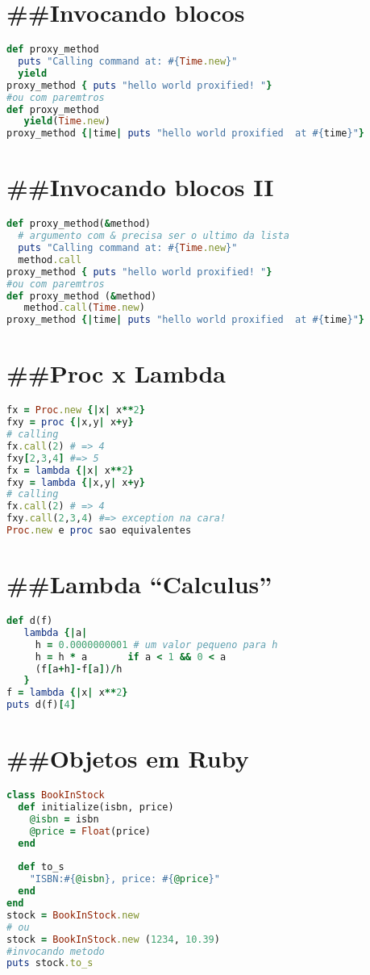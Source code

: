 \documentclass[serif,mathserif]{article}
\begin{document}
\section{\#\#Invocando blocos}
\begin{lstlisting}[language=ruby]
def proxy_method
  puts "Calling command at: #{Time.new}"
  yield
proxy_method { puts "hello world proxified! "}
#ou com paremtros
def proxy_method
   yield(Time.new)
proxy_method {|time| puts "hello world proxified  at #{time}"}
\end{lstlisting}


\section{\#\#Invocando blocos II}
\begin{lstlisting}[language=ruby]
def proxy_method(&method)
  # argumento com & precisa ser o ultimo da lista
  puts "Calling command at: #{Time.new}"
  method.call
proxy_method { puts "hello world proxified! "}
#ou com paremtros
def proxy_method (&method)
   method.call(Time.new)
proxy_method {|time| puts "hello world proxified  at #{time}"}
\end{lstlisting}

\section{\#\#Proc x Lambda}
\begin{lstlisting}[language=ruby]
fx = Proc.new {|x| x**2}
fxy = proc {|x,y| x+y}
# calling
fx.call(2) # => 4
fxy[2,3,4] #=> 5
fx = lambda {|x| x**2}
fxy = lambda {|x,y| x+y}
# calling
fx.call(2) # => 4
fxy.call(2,3,4) #=> exception na cara!
Proc.new e proc sao equivalentes
\end{lstlisting}


\section{\#\#Lambda ``Calculus''}

\begin{lstlisting}[language=ruby, caption="Derivada em Ruby"]
def d(f)
   lambda {|a|
     h = 0.0000000001 # um valor pequeno para h
     h = h * a       if a < 1 && 0 < a
     (f[a+h]-f[a])/h
   }
f = lambda {|x| x**2}
puts d(f)[4]
\end{lstlisting}

\section{\#\#Objetos em Ruby}
\begin{lstlisting}[language=ruby]
class BookInStock
  def initialize(isbn, price)
    @isbn = isbn
    @price = Float(price)
  end
 
  def to_s
    "ISBN:#{@isbn}, price: #{@price}"
  end
end
stock = BookInStock.new
# ou
stock = BookInStock.new (1234, 10.39)
#invocando metodo
puts stock.to_s
\end{lstlisting}
\end{document}
